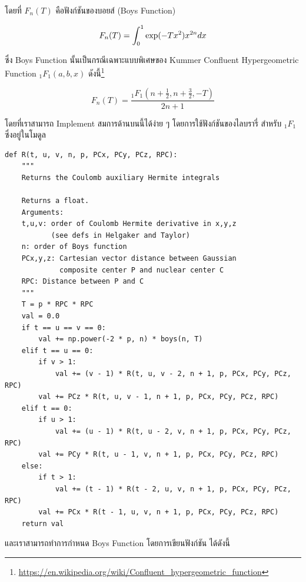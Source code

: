 \noindent โดยที่ $F_n(T)$ คือฟังก์ชันของบอยส์ (Boys Function)

\begin{equation}
  F_n(T)
  =
  \int_0^1 \hbox{exp}(-Tx^2)x^{2n}dx
\end{equation}

\noindent ซึ่ง Boys Function นั้นเป็นกรณีเฉพาะแบบพิเศษของ Kummer Confluent Hypergeometric Function $_1F_1(a,b,x)$
ดังนี้\footnote{\url{https://en.wikipedia.org/wiki/Confluent_hypergeometric_function}}

\begin{equation}
  F_n(T)
  =
  \frac{_1F_1(n+\frac{1}{2}, n+\frac{3}{2}, -T)}{2n+1}
\end{equation}

\noindent โดยที่เราสามารถ Implement สมการด้านบนนี้ได้ง่าย ๆ โดยการใช้ฟังก์ชันของไลบรารี่  สำหรับ $_1F_1$
ซึ่งอยู่ในโมดูล 

\vspace{5pt}

\begin{lstlisting}[style=MyPython]
def R(t, u, v, n, p, PCx, PCy, PCz, RPC):
    """
    Returns the Coulomb auxiliary Hermite integrals

    Returns a float.
    Arguments:
    t,u,v: order of Coulomb Hermite derivative in x,y,z
           (see defs in Helgaker and Taylor)
    n: order of Boys function
    PCx,y,z: Cartesian vector distance between Gaussian
             composite center P and nuclear center C
    RPC: Distance between P and C
    """
    T = p * RPC * RPC
    val = 0.0
    if t == u == v == 0:
        val += np.power(-2 * p, n) * boys(n, T)
    elif t == u == 0:
        if v > 1:
            val += (v - 1) * R(t, u, v - 2, n + 1, p, PCx, PCy, PCz, RPC)
        val += PCz * R(t, u, v - 1, n + 1, p, PCx, PCy, PCz, RPC)
    elif t == 0:
        if u > 1:
            val += (u - 1) * R(t, u - 2, v, n + 1, p, PCx, PCy, PCz, RPC)
        val += PCy * R(t, u - 1, v, n + 1, p, PCx, PCy, PCz, RPC)
    else:
        if t > 1:
            val += (t - 1) * R(t - 2, u, v, n + 1, p, PCx, PCy, PCz, RPC)
        val += PCx * R(t - 1, u, v, n + 1, p, PCx, PCy, PCz, RPC)
    return val
\end{lstlisting}

\vspace{5pt}

\noindent และเราสามารถทำการกำหนด Boys Function โดยการเขียนฟังก์ชัน  ได้ดังนี้

\vspace{5pt}

